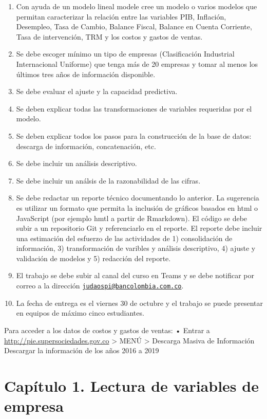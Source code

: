 \documentclass[
  11pt,
]{book}
\begin{document}
\begin{enumerate}
\def\labelenumi{\arabic{enumi}.}
\item
  Con ayuda de un modelo lineal modele cree un modelo o varios modelos
  que permitan caracterizar la relación entre las variables PIB,
  Inflación, Desempleo, Tasa de Cambio, Balance Fiscal, Balance en
  Cuenta Corriente, Tasa de intervención, TRM y los costos y gastos de
  ventas.
\item
  Se debe escoger mínimo un tipo de empresas (Clasificación Industrial
  Internacional Uniforme) que tenga más de 20 empresas y tomar al menos
  los últimos tres años de información disponible.
\item
  Se debe evaluar el ajuste y la capacidad predictiva.
\item
  Se deben explicar todas las transformaciones de variables requeridas
  por el modelo.
\item
  Se deben explicar todos los pasos para la construcción de la base de
  datos: descarga de información, concatenación, etc.
\item
  Se debe incluir un análisis descriptivo.
\item
  Se debe incluir un análsis de la razonabilidad de las cifras.
\item
  Se debe redactar un reporte técnico documentando lo anterior. La
  sugerencia es utilizar un formato que permita la inclusión de gráficos
  basados en html o JavaScript (por ejemplo hmtl a partir de Rmarkdown).
  El código se debe subir a un repositorio Git y referenciarlo en el
  reporte. El reporte debe incluir una estimación del esfuerzo de las
  actividades de 1) consolidación de información, 3) transformación de
  varibles y análisis descriptivo, 4) ajuste y validación de modelos y
  5) redacción del reporte.
\item
  El trabajo se debe subir al canal del curso en Teams y se debe
  notificar por correo a la dirección
  \href{mailto:judaospi@bancolombia.com.co}{\nolinkurl{judaospi@bancolombia.com.co}}.
\item
  La fecha de entrega es el viernes 30 de octubre y el trabajo se puede
  presentar en equipos de máximo cinco estudiantes.
\end{enumerate}

Para acceder a los datos de costos y gastos de ventas: • Entrar a
\url{http://pie.supersociedades.gov.co} \textgreater{} MENÚ
\textgreater{} Descarga Masiva de Información Descargar la información
de los años 2016 a 2019

\hypertarget{capuxedtulo-1.-lectura-de-variables-de-empresa}{%
\chapter{Capítulo 1. Lectura de variables de
empresa}\label{capuxedtulo-1.-lectura-de-variables-de-empresa}}
\end{document}
